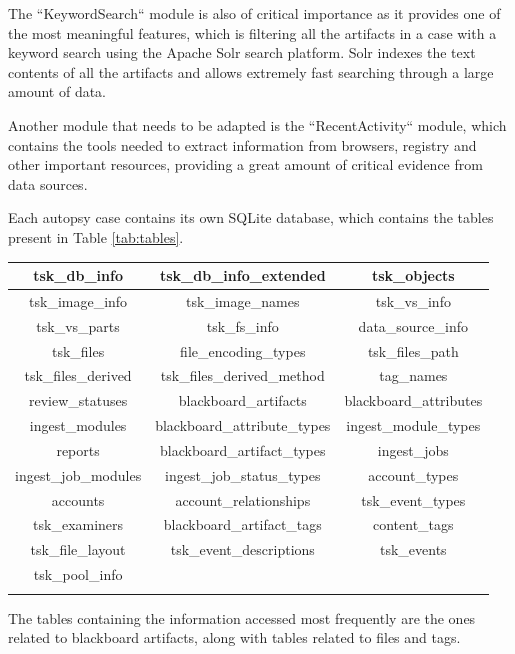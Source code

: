 The ``KeywordSearch`` module is also of critical importance as it provides one of the most meaningful features, which is filtering all the artifacts in a case with a keyword
search using the Apache Solr search platform. Solr indexes the text contents of all the artifacts and allows extremely fast searching through a large amount of data.  

Another module that needs to be adapted is the ``RecentActivity`` module, which contains the tools needed to extract information from browsers, registry and other important resources, providing a great amount of
critical evidence from data sources.

Each autopsy case contains its own SQLite \cite{sqlite} database, which contains the tables present in Table \ref{tab:tables}.

\begin{tabularx}{\textwidth}{|c|c|c|}
    \hline
    tsk\_db\_info & tsk\_db\_info\_extended & tsk\_objects \\
    \hline
    tsk\_image\_info & tsk\_image\_names & tsk\_vs\_info \\
    \hline
    tsk\_vs\_parts & tsk\_fs\_info & data\_source\_info \\
    \hline
    tsk\_files & file\_encoding\_types & tsk\_files\_path \\
    \hline
    tsk\_files\_derived & tsk\_files\_derived\_method & tag\_names \\
    \hline
    review\_statuses & blackboard\_artifacts & blackboard\_attributes \\
    \hline
    ingest\_modules & blackboard\_attribute\_types & ingest\_module\_types \\
    \hline
    reports & blackboard\_artifact\_types & ingest\_jobs \\
    \hline
    ingest\_job\_modules & ingest\_job\_status\_types & account\_types \\
    \hline
    accounts & account\_relationships & tsk\_event\_types \\
    \hline
    tsk\_examiners & blackboard\_artifact\_tags & content\_tags \\
    \hline
    tsk\_file\_layout & tsk\_event\_descriptions & tsk\_events \\
    \hline
    tsk\_pool\_info & & \\
    \hline
    \caption{Case Database Tables}
    \label{tab:tables}
\end{tabularx}

The tables containing the information accessed most frequently are the ones related to blackboard artifacts, along with tables related to files and tags.

